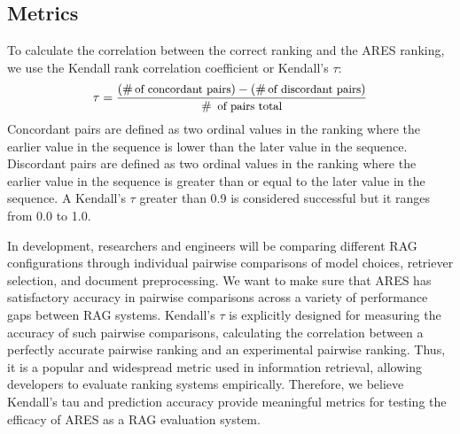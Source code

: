\subsection{Metrics}

To calculate the correlation between the correct ranking and the ARES ranking, we use the Kendall rank correlation coefficient or Kendall's $\tau$:
\begin{equation*} 
\small
{\tau = \frac{(\# \, \text{of concordant pairs}) \\ - (\# \, \text{of discordant pairs})}{\# \, \text{ of pairs total}}}
\end{equation*}
Concordant pairs are defined as two ordinal values in the ranking where the earlier value in the sequence is lower than the later value in the sequence. Discordant pairs are defined as two ordinal values in the ranking where the earlier value in the sequence is greater than or equal to the later value in the sequence.
A Kendall's $\tau$ greater than 0.9 is considered successful but it ranges from 0.0 to 1.0.

In development, researchers and engineers will be comparing different RAG configurations through individual pairwise comparisons of model choices, retriever selection, and document preprocessing.
We want to make sure that ARES has satisfactory accuracy in pairwise comparisons across a variety of performance gaps between RAG systems. 
Kendall's $\tau$ is explicitly designed for measuring the accuracy of such pairwise comparisons, calculating the correlation between a perfectly accurate pairwise ranking and an experimental pairwise ranking.
Thus, it is a popular and widespread metric used in information retrieval, allowing developers to evaluate ranking systems empirically.
Therefore, we believe Kendall's tau and  prediction accuracy provide meaningful metrics for testing the efficacy of ARES as a RAG evaluation system.
